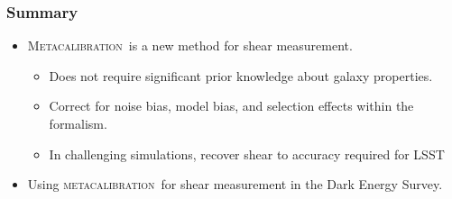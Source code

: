 \documentclass{beamer}
\newcommand{\mcal}{\textsc{metacalibration}}
\newcommand{\Mcal}{\textsc{Metacalibration}}
\begin{document}
\frame
{
    \frametitle{Summary}
    \begin{itemize}
        \item \Mcal\ is a new method for shear measurement.
            \begin{itemize}
                \item Does not require significant prior knowledge about galaxy properties.
                \item Correct for noise bias, model bias, and selection effects within 
                    the formalism.
                \item In challenging simulations, recover shear to accuracy required
                    for LSST
            \end{itemize}

        \item Using \mcal\ for shear measurement in the Dark Energy Survey.

    \end{itemize}
}
\end{document}
